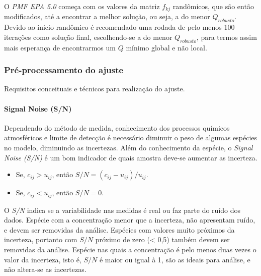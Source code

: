 O \textit{PMF EPA 5.0} começa com os valores da matriz $f_{kj}$ randômicos, 
que são então modificados, até a encontrar a melhor solução, ou seja, 
a do menor $Q_{robusto}$. 
Devido ao inicio randômico é recomendado uma rodada de pelo menos 100 iterações 
como solução final, escolhendo-se a do menor $Q_{robusto}$, para termos assim 
mais esperança de encontrarmos um $Q$ mínimo global e não local. 



\subsubsection{Pré-processamento do ajuste}
Requisitos conceituais e técnicos para realização do ajuste.

\paragraph{Signal Noise (S/N)}

Dependendo do método de medida, conhecimento dos processos químicos 
atmosféricos e limite de detecção é necessário diminuir o peso de algumas 
espécies no modelo, diminuindo as incertezas. 
Além do conhecimento da espécie, o \textit{Signal Noise (S/N)} é um bom 
indicador de quais amostra deve-se aumentar as incerteza.

\begin{itemize}
  \item Se, $c_{ij} >  u_{ij}$, então $ S/N = (c_{ij} - u_{ij})/u_{ij}$.
  \item Se, $c_{ij} <  u_{ij}$, então $S/N = 0 $.
\end{itemize}

O \textit{S/N} indica se a variabilidade nas medidas é real ou faz parte do 
ruído dos dados. 
Espécie com a concentração menor que a incerteza, não apresentam ruído, e devem 
ser removidas da análise. Espécies com valores muito próximos da incerteza, 
portanto com $S/N$ próximo de zero (< 0,5) também devem ser removidas da 
análise. 
Espécie nas quais a concentração é pelo menos duas vezes o valor da incerteza, 
isto é, $S/N$ é maior ou igual à 1, são as ideais para análise, 
e não altera-se as incertezas. 

